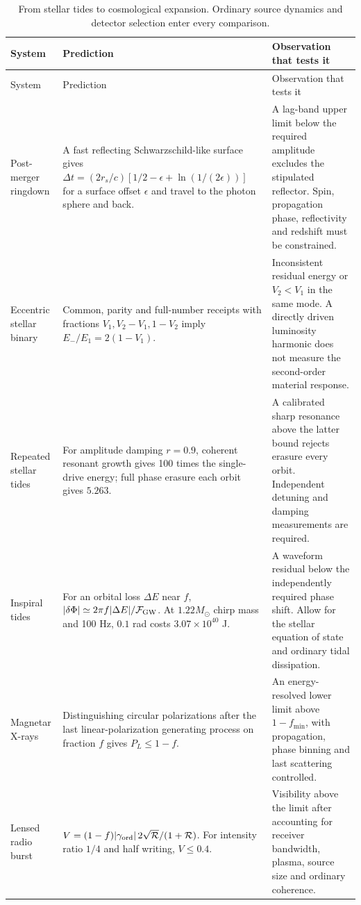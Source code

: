 \small
\begin{longtable}{@{}L{.215\linewidth}L{.36\linewidth}L{.36\linewidth}@{}}
\caption{From stellar tides to cosmological expansion. Ordinary source dynamics and detector selection enter every comparison.}\\
\toprule System & Prediction & Observation that tests it\\\midrule\endfirsthead
\toprule System & Prediction & Observation that tests it\\\midrule\endhead
Post-merger ringdown & A fast reflecting Schwarzschild-like surface gives \(\Delta t=(2r_s/c)[1/2-\epsilon+\ln(1/(2\epsilon))]\) for a surface offset \(\epsilon\) and travel to the photon sphere and back. & A lag-band upper limit below the required amplitude excludes the stipulated reflector. Spin, propagation phase, reflectivity and redshift must be constrained.\\[3pt]
Eccentric stellar binary & Common, parity and full-number receipts with fractions \(V_1,V_2-V_1,1-V_2\) imply \(E_-/E_1=2(1-V_1)\). & Inconsistent residual energy or \(V_2<V_1\) in the same mode. A directly driven luminosity harmonic does not measure the second-order material response.\\[3pt]
Repeated stellar tides & For amplitude damping \(r=0.9\), coherent resonant growth gives 100 times the single-drive energy; full phase erasure each orbit gives \(5.263\). & A calibrated sharp resonance above the latter bound rejects erasure every orbit. Independent detuning and damping measurements are required.\\[3pt]
Inspiral tides & For an orbital loss \(\Delta E\) near \(f\), \(|\delta\Phi|\simeq2\pi f|\Delta E|/{\cal F}_{\rm GW}\). At \(1.22M_\odot\) chirp mass and 100 Hz, \(0.1\) rad costs \(3.07\times10^{40}\) J. & A waveform residual below the independently required phase shift. Allow for the stellar equation of state and ordinary tidal dissipation.\\[3pt]
Magnetar X-rays & Distinguishing circular polarizations after the last linear-polarization generating process on fraction \(f\) gives \(P_L\le1-f\). & An energy-resolved lower limit above \(1-f_{\min}\), with propagation, phase binning and last scattering controlled.\\[3pt]
Lensed radio burst & \(V=(1-f)|\gamma_{\rm ord}|\,2\sqrt{\mathcal R}/(1+\mathcal R)\). For intensity ratio \(1/4\) and half writing, \(V\le0.4\). & Visibility above the limit after accounting for receiver bandwidth, plasma, source size and ordinary coherence.\\[3pt]

\end{longtable}
